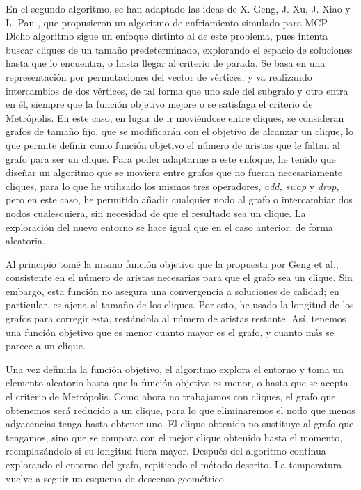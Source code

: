 En el segundo algoritmo, se han adaptado las ideas de X. Geng, J. Xu, J. Xiao y L. Pan \citep{geng:2007},
que propusieron un algoritmo de enfriamiento simulado para MCP. Dicho algoritmo sigue
un enfoque distinto al de este problema, pues intenta buscar cliques de un tamaño
predeterminado, explorando el espacio de soluciones hasta que lo encuentra, o hasta
llegar al criterio de parada. Se basa en una representación por permutaciones del
vector de vértices, y va realizando intercambios de dos vértices, de tal forma que
uno sale del subgrafo y otro entra en él, siempre que la función objetivo mejore o
se satisfaga el criterio de Metrópolis. En este caso, en lugar de ir moviéndose entre
cliques, se consideran grafos de tamaño fijo, que se modificarán con el objetivo de
alcanzar un clique, lo que permite definir como función objetivo el número de aristas
que le faltan al grafo para ser un clique. Para poder adaptarme a este enfoque, he
tenido que diseñar un algoritmo que se moviera entre grafos que no fueran necesariamente
cliques, para lo que he utilizado los mismos tres operadores, \textit{add, swap} y
\textit{drop}, pero en este caso, he permitido añadir cualquier nodo al grafo o intercambiar
dos nodos cualesquiera, sin necesidad de que el resultado sea un clique. La exploración del
nuevo entorno se hace igual que en el caso anterior, de forma aleatoria.

Al principio tomé la mismo función objetivo que la propuesta por Geng et al., consistente
en el número de aristas necesarias para que el grafo sea un clique. Sin embargo, esta
función no asegura una convergencia a soluciones de calidad; en particular, es ajena al
tamaño de los cliques. Por esto, he usado la longitud de los grafos para corregir esta,
restándola al número de aristas restante. Así, tenemos una función objetivo que es menor
cuanto mayor es el grafo, y cuanto más se parece a un clique.

Una vez definida la función objetivo, el algoritmo explora el entorno y toma un elemento
aleatorio hasta que la función objetivo es menor, o hasta que se acepta el criterio de
Metrópolis. Como ahora no trabajamos con cliques, el grafo que obtenemos será reducido
a un clique, para lo que eliminaremos el nodo que menos adyacencias tenga hasta obtener uno.
El clique obtenido no sustituye al grafo que tengamos, sino que se compara con el mejor
clique obtenido hasta el momento, reemplazándolo si su longitud fuera mayor. Después
del algoritmo continua explorando el entorno del grafo, repitiendo el método descrito.
La temperatura vuelve a seguir un esquema de descenso geométrico.

